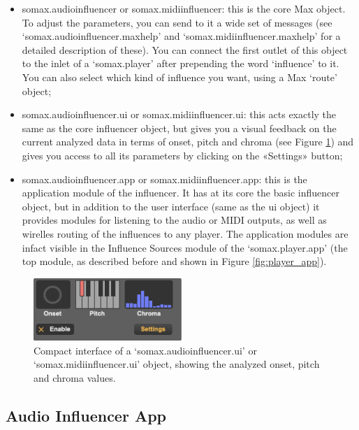 \begin{itemize}
    \item somax.audioinfluencer or somax.midiinfluencer: this is the core Max object. To adjust the parameters, you can send to it a wide set of messages (see `somax.audioinfluencer.maxhelp' and `somax.midiinfluencer.maxhelp' for a detailed description of these). You can connect the first outlet of this object to the inlet of a `somax.player' after prepending the word `influence' to it. You can also select which kind of influence you want, using a Max `route' object;
    \item somax.audioinfluencer.ui or somax.midiinfluencer.ui: this acts exactly the same as the core influencer object, but gives you a visual feedback on the current analyzed data in terms of onset, pitch and chroma (see Figure \ref{fig:influencer_ui}) and gives you access to all its parameters by clicking on the «Settings» button;
    \item somax.audioinfluencer.app or somax.midiinfluencer.app: this is the application module of the influencer. It has at its core the basic influencer object, but in addition to the user interface (same as the ui object) it provides modules for listening to the audio or MIDI outputs, as well as wirelles routing of the influences to any player. The application modules are infact visible in the Influence Sources module of the `somax.player.app' (the top module, as described before and shown in Figure \ref{fig:player_app}).
\end{itemize}


 \begin{figure}[H]
    \centering        
 	\includegraphics[width=0.5\textwidth, keepaspectratio]{img/influencer_ui.png}
    \caption{Compact interface of a `somax.audioinfluencer.ui' or `somax.midiinfluencer.ui' object, showing the analyzed onset, pitch and chroma values.}
    \label{fig:influencer_ui}
\end{figure}


\subsection{Audio Influencer App}

